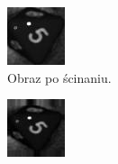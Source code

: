 \begin{figure}[h]
    \begin{subfigure}[t]{0.32\linewidth}
        \centering
        \includegraphics[width=\linewidth]{chapters/04-czytanie/figures/5_shear}
        \caption{Obraz po ścinaniu.}
        \label{fig:5shear}
    \end{subfigure}
    \hfill
    \begin{subfigure}[t]{0.32\linewidth}
        \centering
        \includegraphics[width=\linewidth]{chapters/04-czytanie/figures/5_zoom}

\end{subfigure}
\end{figure}
